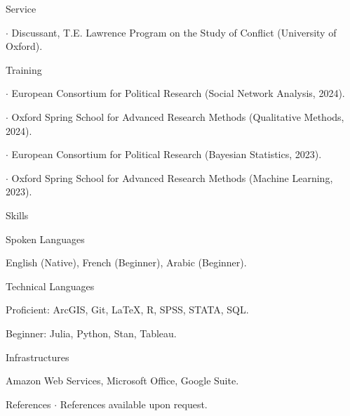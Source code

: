 \documentclass[10pt]{resume} %
\begin{document}
	\begin{rSection}{Service} \itemsep -5pt
		\item $\cdot$ Discussant, T.E. Lawrence Program on the Study of Conflict (University of Oxford).
	\end{rSection}

	\begin{rSection}{Training} \itemsep -5pt
		
		\item $\cdot$ European Consortium for Political Research (Social Network Analysis, 2024).
    
    \item $\cdot$ Oxford Spring School for Advanced Research Methods (Qualitative Methods, 2024).
		
		\item $\cdot$ European Consortium for Political Research (Bayesian Statistics, 2023).
		
		\item $\cdot$ Oxford Spring School for Advanced Research Methods (Machine Learning, 2023).
	
	\end{rSection}

	\begin{rSection}{Skills} \itemsep -5pt
		
		\begin{rSubsection}{Spoken Languages}{}{}
			
			\item English (Native), French (Beginner), Arabic (Beginner).
		
		\end{rSubsection}
		
		\begin{rSubsection}{Technical Languages}{}{}
			
			\item Proficient: ArcGIS, Git, \LaTeX, R, SPSS, STATA, SQL.
			
			\item Beginner: Julia, Python, Stan, Tableau.
		
		\end{rSubsection}
		
		\begin{rSubsection}{Infrastructures}{}{}
			
			\item Amazon Web Services, Microsoft Office, Google Suite.
		
		\end{rSubsection}
		
	\end{rSection}
	
	\begin{rSection}{References}
		$\cdot$ References available upon request. 
	\end{rSection}
	
\end{document}
